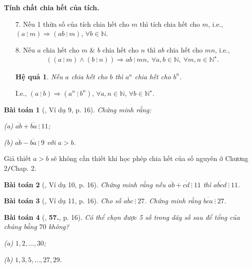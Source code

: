 \documentclass[oneside]{book}
\numberwithin{equation}{section}
\newtheorem{hequa}{Hệ quả}[section]
\newtheorem{baitoan}{Bài toán}[section]
\begin{document}
\noindent\textbf{Tính chất chia hết của tích.}
\begin{enumerate}
	\item[7.] Nếu 1 thừa số của tích chia hết cho $m$ thì tích chia hết cho $m$, i.e., $(a\ \vdots\ m)\Rightarrow(ab\ \vdots\ m)$, $\forall b\in\mathbb{N}$.
	\item[8.] Nếu $a$ chia hết cho $m$ \& $b$ chia hết cho $n$ thì $ab$ chia hết cho $mn$, i.e.,
	\begin{align*}
		((a\ \vdots\ m)\land(b\ \vdots\ n))\Rightarrow ab\ \vdots\ mn,\ \forall a,b\in\mathbb{N},\ \forall m,n\in\mathbb{N}^\star.
	\end{align*}

	\begin{hequa}
		Nếu $a$ chia hết cho $b$ thì $a^n$ chia hết cho $b^n$.
	\end{hequa}
	I.e., $(a\ \vdots\ b)\Rightarrow(a^n\ \vdots\ b^n)$, $\forall a,n\in\mathbb{N}$, $\forall b\in\mathbb{N}^\star$.
\end{enumerate}

\begin{baitoan}[\cite{Binh_Toan_6_tap_1}, Ví dụ 9, p. 16]
	Chứng minh rằng:
	\begin{enumerate*}
		\item[(a)] $\overline{ab} + \overline{ba}\ \vdots\ 11$;
		\item[(b)] $\overline{ab} - \overline{ba}\ \vdots\ 9$ với $a > b$.
	\end{enumerate*}
\end{baitoan}
Giả thiết $a > b$ sẽ không cần thiết khi học phép chia hết của số nguyên ở Chương 2\texttt{/}Chap. 2.

\begin{baitoan}[\cite{Binh_Toan_6_tap_1}, Ví dụ 10, p. 16]
	Chứng minh rằng nếu $\overline{ab} + \overline{cd}\ \vdots\ 11$ thì $\overline{abcd}\ \vdots\ 11$.
\end{baitoan}

\begin{baitoan}[\cite{Binh_Toan_6_tap_1}, Ví dụ 11, p. 16]
	Cho số $\overline{abc}\ \vdots\ 27$. Chứng minh rằng $\overline{bca}\ \vdots\ 27$.
\end{baitoan}

\begin{baitoan}[\cite{Binh_Toan_6_tap_1}, \textbf{57.}, p. 16]
	Có thể chọn được 5 số trong dãy số sau để tổng của chúng bằng $70$ không?
	\begin{enumerate*}
		\item[(a)] $1,2,\ldots,30$;
		\item[(b)] $1,3,5,\ldots,27,29$.
	\end{enumerate*}
\end{baitoan}
\end{document}

